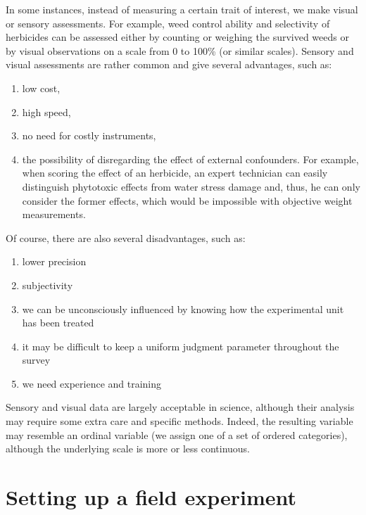 \documentclass[a4paper,12pt,oneside]{book}
\providecommand{\tightlist}{%
  \setlength{\itemsep}{0pt}\setlength{\parskip}{0pt}}
\begin{document}
In some instances, instead of measuring a certain trait of interest, we make visual or sensory assessments. For example, weed control ability and selectivity of herbicides can be assessed either by counting or weighing the survived weeds or by visual observations on a scale from 0 to 100\% (or similar scales). Sensory and visual assessments are rather common and give several advantages, such as:

\begin{enumerate}
\def\labelenumi{\arabic{enumi}.}
\tightlist
\item
  low cost,
\item
  high speed,
\item
  no need for costly instruments,
\item
  the possibility of disregarding the effect of external confounders. For example, when scoring the effect of an herbicide, an expert technician can easily distinguish phytotoxic effects from water stress damage and, thus, he can only consider the former effects, which would be impossible with objective weight measurements.
\end{enumerate}

Of course, there are also several disadvantages, such as:

\begin{enumerate}
\def\labelenumi{\arabic{enumi}.}
\tightlist
\item
  lower precision
\item
  subjectivity
\item
  we can be unconsciously influenced by knowing how the experimental unit has been treated
\item
  it may be difficult to keep a uniform judgment parameter throughout the survey
\item
  we need experience and training
\end{enumerate}

Sensory and visual data are largely acceptable in science, although their analysis may require some extra care and specific methods. Indeed, the resulting variable may resemble an ordinal variable (we assign one of a set of ordered categories), although the underlying scale is more or less continuous.

\hypertarget{setting-up-a-field-experiment}{%
\section{Setting up a field experiment}\label{setting-up-a-field-experiment}}
\end{document}
